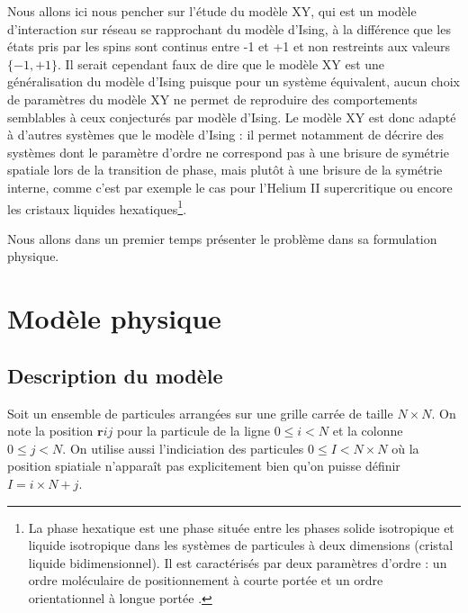 \documentclass[a4paper, openany, 11pt]{article}
\newcommand{\vr}{\bm{r}}
\begin{document}
Nous allons ici nous pencher sur l'étude du modèle XY, qui est un modèle d'interaction sur réseau se
rapprochant du modèle d'Ising, à la différence que les états pris par les spins sont continus entre
-1 et +1 et non restreints aux valeurs $\{-1, +1\}$. Il serait cependant faux de dire que le modèle
XY est une généralisation du modèle d'Ising puisque pour un système équivalent, aucun choix de
paramètres du modèle XY ne permet de reproduire des comportements semblables à ceux conjecturés par
modèle d'Ising. Le modèle XY est donc adapté à d'autres systèmes que le modèle d'Ising : il permet
notamment de décrire des systèmes dont le paramètre d'ordre ne correspond pas à une brisure de
symétrie spatiale lors de la transition de phase, mais plutôt à une brisure de la symétrie interne,
comme c'est par exemple le cas pour  l'Helium II supercritique ou encore les cristaux liquides
hexatiques\footnote{La phase hexatique est une phase située entre les phases solide isotropique et
liquide isotropique dans les systèmes de particules à deux dimensions (cristal liquide
bidimensionnel). Il est caractérisés par deux paramètres d'ordre : un ordre moléculaire de
positionnement à courte portée et un ordre orientationnel à longue portée
\cite{wiki:phase_hexatique}.}.

Nous allons dans un premier temps présenter le problème dans sa formulation physique.
 
\section{Modèle physique}

\subsection{Description du modèle}

Soit un ensemble de particules arrangées sur une grille carrée de taille $N\times N$. On note la
position $\vr{ij}$ pour la particule de la ligne $0 \le i < N$ et la colonne $0 \le j < N$. On
utilise aussi l'indiciation des particules $0 \le I < N\times N$ où la position spiatiale n'apparaît
pas explicitement bien qu'on puisse définir $I = i\times N +j$.
\end{document}
